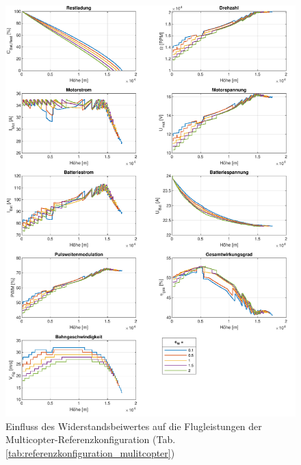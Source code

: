 \begin{figure}[H]
\centering
	\includegraphics[scale=0.7]{Diagramme/Untersuchung_c_W.pdf}
	\caption{Einfluss des Widerstandsbeiwertes auf die Flugleistungen der Multicopter-Referenzkonfiguration (Tab. \ref{tab:referenzkonfiguration_mulitcopter})}
	\label{abb:c_W_einfluss}
\end{figure}


